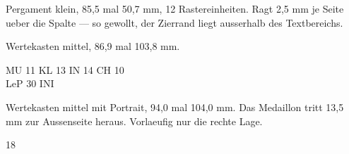 \documentclass[raster,rasterzeigen]{dsa5latex}
\begin{document}


\clearpage


\begin{dsaPergamentKlein}
Pergament klein, 85,5 mal 50,7 mm, 12 Rastereinheiten. Ragt 2,5 mm je Seite
ueber die Spalte — so gewollt, der Zierrand liegt ausserhalb des
Textbereichs.
\end{dsaPergamentKlein}

\begin{dsaWerteMittel}
Wertekasten mittel, 86,9 mal 103,8 mm.

\begin{dsaWerteblock}
MU 11 \quad KL 13 \quad IN 14 \quad CH 10\\
LeP 30 \quad INI 
\end{dsaWerteblock}
\end{dsaWerteMittel}

\clearpage

\begin{dsaWerteMittelPortrait}[dsaportrait=grafiken/aventurienkarte]
Wertekasten mittel mit Portrait, 94,0 mal 104,0 mm. Das Medaillon tritt
13,5 mm zur Aussenseite heraus. Vorlaeufig nur die rechte Lage.
\end{dsaWerteMittelPortrait}

\begin{dsaWerteFreiPortrait}[dsaportrait=grafiken/aventurienkarte]{18}
\end{dsaWerteFreiPortrait}
\end{document}
